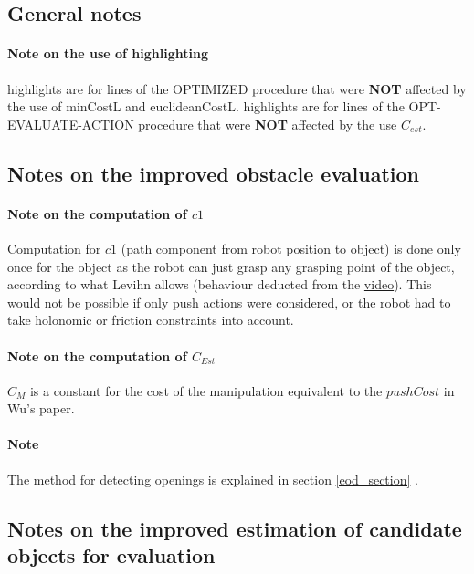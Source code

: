 \subsection*{General notes}

\paragraph{Note on the use of highlighting}\label{highlight_note}  highlights are for lines of the OPTIMIZED procedure that were \textbf{NOT} affected by the use of minCostL and euclideanCostL.  highlights are for lines of the OPT-EVALUATE-ACTION procedure that were \textbf{NOT} affected by the use $C_{est}$.

\subsection*{Notes on the improved obstacle evaluation}

\paragraph{Note on the computation of $c1$}\label{c1_computation_note} Computation for $c1$ (path component from robot position to object) is done only once for the object as the robot can just grasp any grasping point of the object, according to what Levihn allows (behaviour deducted from the \href{https://www.youtube.com/watch?v=3AvfPVzBb-s}{video}). This would not be possible if only push actions were considered, or the robot had to take holonomic or friction constraints into account.

\paragraph{Note on the computation of $C_{Est}$}\label{cest_computation_note} $C_{M}$ is a constant for the cost of the manipulation equivalent to the $pushCost$ in Wu's paper.

\paragraph{Note}\label{second_opening_detection_note} The method for detecting openings is explained in section \ref{eod_section} .

\subsection*{Notes on the improved estimation of candidate objects for evaluation}

